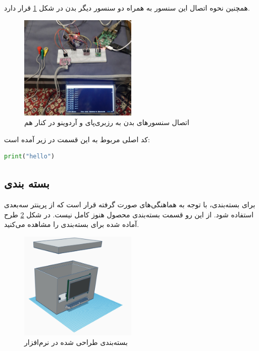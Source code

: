 همچنین نحوه اتصال این سنسور به همراه دو سنسور دیگر بدن در شکل \ref{fig:7} قرار دارد.


\begin{figure}[h]
	\centering
	\includegraphics[width=0.5\textwidth]{figs/allbody.jpg}
	
	\caption{اتصال سنسورهای بدن به رزبری‌پای و آردوینو در کنار هم}
	\label{fig:7}
\end{figure}

کد اصلی مربوط به این قسمت در زیر آمده است:

\begin{latin}
	\begin{lstlisting}[language=python]
		print("hello")
	\end{lstlisting}
\end{latin}


\subsection{بسته بندی}

برای بسته‌بندی، با توجه به هماهنگی‌های صورت گرفته قرار است که از پرینتر سه‌بعدی استفاده شود. از این رو قسمت بسته‌بندی محصول هنوز کامل نیست. در شکل \ref{fig:9} طرح آماده شده برای بسته‌بندی را مشاهده می‌کنید.

\begin{figure}[h]
	\centering
	\includegraphics[width=0.5\textwidth]{figs/package.png}
	
	\caption{بسته‌بندی طراحی شده در نرم‌افزار }
	\label{fig:9}
\end{figure}

